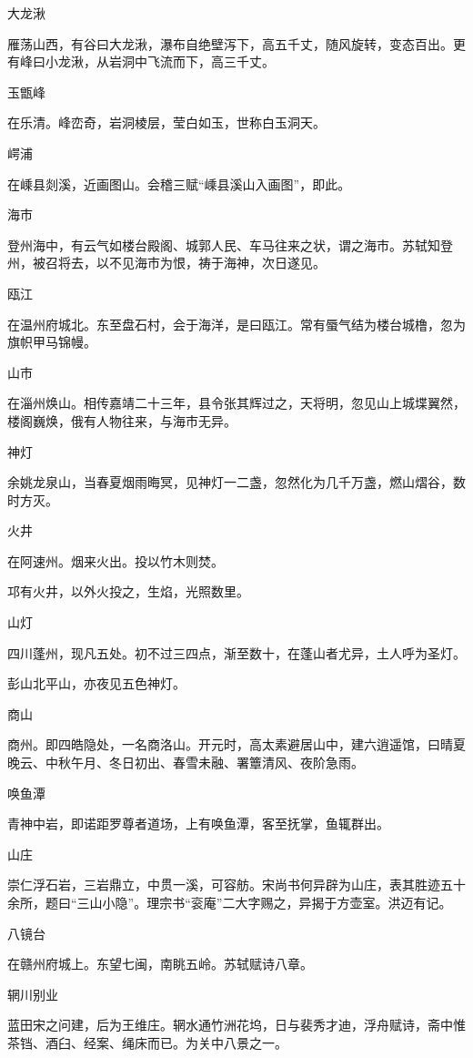 \documentclass[a4paper,12pt,UTF8,twoside]{ctexbook}
\begin{document}
大龙湫

雁荡山西，有谷曰大龙湫，瀑布自绝壁泻下，高五千丈，随风旋转，变态百出。更有峰曰小龙湫，从岩洞中飞流而下，高三千丈。

玉甑峰

在乐清。峰峦奇，岩洞棱层，莹白如玉，世称白玉洞天。

崿浦

在嵊县剡溪，近画图山。会稽三赋“嵊县溪山入画图”，即此。

海市

登州海中，有云气如楼台殿阁、城郭人民、车马往来之状，谓之海市。苏轼知登州，被召将去，以不见海市为恨，祷于海神，次日遂见。

瓯江

在温州府城北。东至盘石村，会于海洋，是曰瓯江。常有蜃气结为楼台城橹，忽为旗帜甲马锦幔。

山市

在淄州焕山。相传嘉靖二十三年，县令张其辉过之，天将明，忽见山上城堞翼然，楼阁巍焕，俄有人物往来，与海市无异。

神灯

余姚龙泉山，当春夏烟雨晦冥，见神灯一二盏，忽然化为几千万盏，燃山熠谷，数时方灭。

火井

在阿速州。烟来火出。投以竹木则焚。

邛有火井，以外火投之，生焰，光照数里。

山灯

四川蓬州，现凡五处。初不过三四点，渐至数十，在蓬山者尤异，土人呼为圣灯。

彭山北平山，亦夜见五色神灯。

商山

商州。即四皓隐处，一名商洛山。开元时，高太素避居山中，建六逍遥馆，曰晴夏晚云、中秋午月、冬日初出、春雪未融、署簟清风、夜阶急雨。

唤鱼潭

青神中岩，即诺距罗尊者道场，上有唤鱼潭，客至抚掌，鱼辄群出。

山庄

崇仁浮石岩，三岩鼎立，中贯一溪，可容舫。宋尚书何异辟为山庄，表其胜迹五十余所，题曰“三山小隐”。理宗书“衮庵”二大字赐之，异揭于方壶室。洪迈有记。

八镜台

在赣州府城上。东望七闽，南眺五岭。苏轼赋诗八章。

辋川别业

蓝田宋之问建，后为王维庄。辋水通竹洲花坞，日与裴秀才迪，浮舟赋诗，斋中惟茶铛、酒臼、经案、绳床而已。为关中八景之一。
\end{document}

